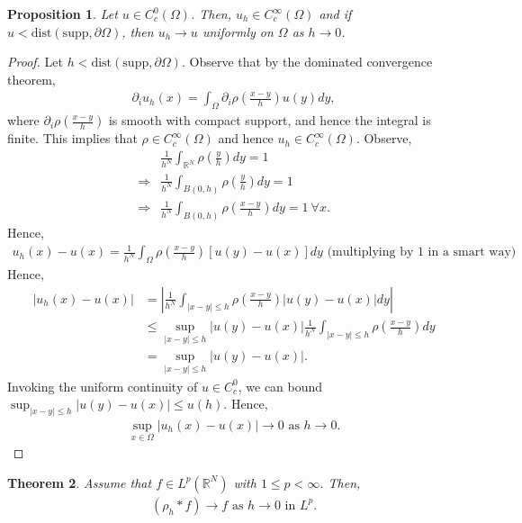 \documentclass[psamsfonts]{amsart}
\newtheorem{thm}{Theorem}[section]
\newtheorem{prop}[thm]{Proposition}
\theoremstyle{definition}
\theoremstyle{remark}
\newcommand{\R}[0]{\mathbb{R}}
\numberwithin{equation}{section}
\begin{document}
\begin{prop}
	Let \( u \in C_c^0(\Omega) \). Then, \( u_h \in C_c^\infty (\Omega) \) and if \( u < \mathrm{dist}(\mathrm{supp}, \partial \Omega ) \), then \( u_h \rightarrow u \) uniformly on \( \Omega \) as \( h \rightarrow 0 \). 
\end{prop}

\begin{proof}
	Let \( h < \mathrm{dist}(\mathrm{supp}, \partial \Omega) \). Observe that by the dominated convergence theorem, 
	\begin{align*}
		\partial_i u_h(x) = \int_\Omega \partial_i \rho \left( \frac{x-y}{h} \right) u(y)dy, 
	\end{align*}
	where \( \partial_i \rho \left( \frac{x-y}{h} \right)  \) is smooth with compact support, and hence the integral is finite. This implies that \( \rho \in C_c^\infty (\Omega) \) and hence \( u_h \in C_c^\infty (\Omega ) \). Observe, 
	\begin{align*}
		& \frac{1}{h^N} \int_{\R^N} \rho \left( \frac{y}{h} \right) dy = 1 \\
		\Rightarrow & \frac{1}{h^N} \int_{B(0, h)} \rho \left( \frac{y}{h} \right) dy = 1  \\
		\Rightarrow & \frac{1}{h^N} \int_{B(0,h)} \rho \left( \frac{x-y}{h} \right) dy = 1\ \forall x.  
	\end{align*}
	Hence, 
	\begin{align*}
		u_h(x) - u(x) = \frac{1}{h^N} \int_{\Omega} \rho \left( \frac{x-y}{h} \right) [ u(y) - u(x) ] dy  \text{ (multiplying by 1 in a smart way)} 
	\end{align*}
	Hence, 
	\begin{align*}
		| u_h(x) - u(x) | & = \left| \frac{1}{h^N} \int_{|x-y| \leq h} \rho \left( \frac{x-y}{h} \right) |u(y) - u(x) | dy \right|  \\
		& \leq \sup_{|x-y| \leq h } |u(y) - u(x) | \frac{1}{h^N} \int_{|x-y| \leq h } \rho \left( \frac{x-y}{h} \right) dy \\
		& = \sup_{|x-y| \leq h } |u(y) - u(x) |. 
	\end{align*}
	Invoking the uniform continuity of \( u \in C_c^0 \), we can bound \( \sup_{|x-y| \leq h } |u(y) - u(x) | \leq u(h) \). Hence, 
	\begin{align*}
		\sup_{x \in \Omega} |u_h(x) - u(x) | \rightarrow 0 \text{ as } h \rightarrow 0.
	\end{align*}
\end{proof}

\begin{thm}
	Assume that \( f \in L^p(\R^N) \) with \( 1 \leq p < \infty \). Then, 
	\begin{align*}
		(\rho_h *f) \rightarrow f \text{ as } h \rightarrow 0 \text{ in } L^p.
	\end{align*}	
\end{thm}
\end{document}
